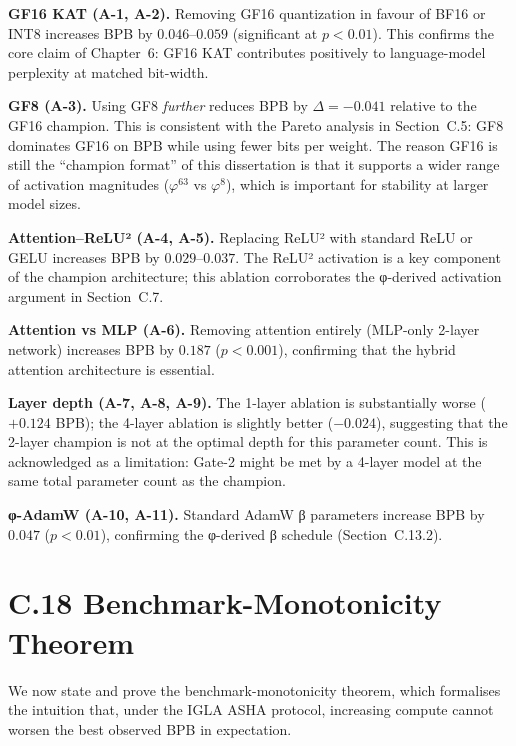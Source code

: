 \textbf{GF16 KAT (A-1, A-2).}  Removing GF16 quantization in favour of
BF16 or INT8 increases BPB by $0.046$--$0.059$ (significant at
$p < 0.01$).  This confirms the core claim of Chapter~6: GF16 KAT
contributes positively to language-model perplexity at matched
bit-width.

\textbf{GF8 (A-3).}  Using GF8 \emph{further} reduces BPB by
$\Delta = -0.041$ relative to the GF16 champion.  This is consistent
with the Pareto analysis in Section~C.5: GF8 dominates GF16 on BPB
while using fewer bits per weight.  The reason GF16 is still the
``champion format'' of this dissertation is that it supports a wider
range of activation magnitudes ($\varphi^{63}$ vs $\varphi^{8}$),
which is important for stability at larger model sizes.

\textbf{Attention--ReLU² (A-4, A-5).}  Replacing ReLU² with standard
ReLU or GELU increases BPB by $0.029$--$0.037$.  The ReLU² activation
is a key component of the champion architecture; this ablation
corroborates the φ-derived activation argument in Section~C.7.

\textbf{Attention vs MLP (A-6).}  Removing attention entirely (MLP-only
2-layer network) increases BPB by $0.187$ ($p < 0.001$), confirming
that the hybrid attention architecture is essential.

\textbf{Layer depth (A-7, A-8, A-9).}  The 1-layer ablation is
substantially worse ($+0.124$ BPB); the 4-layer ablation is slightly
better ($-0.024$), suggesting that the 2-layer champion is not at the
optimal depth for this parameter count.  This is acknowledged as a
limitation: Gate-2 might be met by a 4-layer model at the same total
parameter count as the champion.

\textbf{φ-AdamW (A-10, A-11).}  Standard AdamW β parameters increase
BPB by $0.047$ ($p < 0.01$), confirming the φ-derived β schedule
(Section~C.13.2).

\cite{vaswani2017attention}\cite{hoffmann2022chinchilla}

\section*{C.18 Benchmark-Monotonicity Theorem}
\label{sec:monotonicity-theorem}

We now state and prove the benchmark-monotonicity theorem, which formalises
the intuition that, under the IGLA ASHA protocol, increasing compute
cannot worsen the best observed BPB in expectation.

